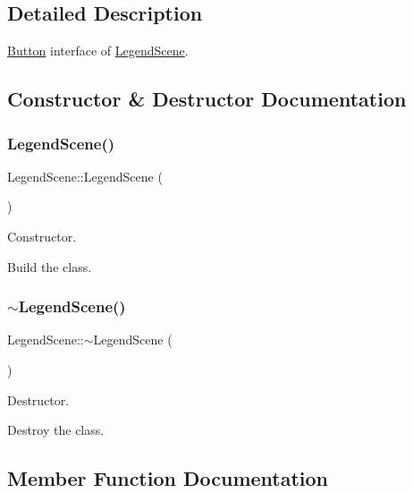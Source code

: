 \subsection{Detailed Description}
\hyperlink{classButton}{Button} interface of \hyperlink{classLegendScene}{Legend\+Scene}. 

\subsection{Constructor \& Destructor Documentation}
\mbox{\label{classLegendScene_a33a4d96e0e320724e60d565dec448e38}} 
\subsubsection{\texorpdfstring{Legend\+Scene()}{LegendScene()}}
{\footnotesize\ttfamily Legend\+Scene\+::\+Legend\+Scene (\begin{DoxyParamCaption}{ }\end{DoxyParamCaption})}



Constructor. 

Build the class. \mbox{\label{classLegendScene_a88e66f9964236616735c7b9873641141}} 
\subsubsection{\texorpdfstring{$\sim$\+Legend\+Scene()}{~LegendScene()}}
{\footnotesize\ttfamily Legend\+Scene\+::$\sim$\+Legend\+Scene (\begin{DoxyParamCaption}{ }\end{DoxyParamCaption})}



Destructor. 

Destroy the class. 

\subsection{Member Function Documentation}
\mbox{\label{classLegendScene_ab11340ae844c04d704f28e1ef188deae}} 
